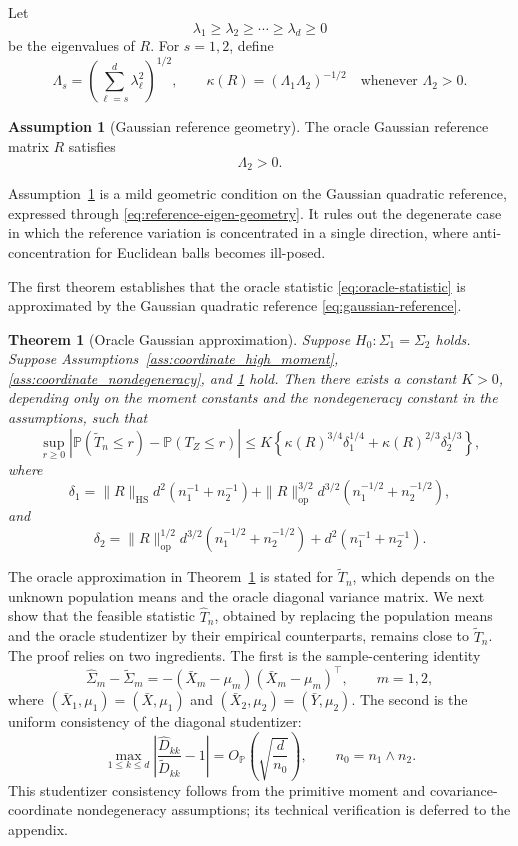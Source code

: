 \documentclass[
  12pt]{article}
\theoremstyle{plain}
\newtheorem{theorem}{Theorem}[section]
\theoremstyle{definition}
\newtheorem{assumption}{Assumption}[section]
\theoremstyle{remark}
\begin{document}
Let
\[
\lambda_1\ge\lambda_2\ge\cdots\ge\lambda_d\ge0
\]
be the eigenvalues of \(R\).  For \(s=1,2\), define
\begin{equation}
\label{eq:reference-eigen-geometry}
\Lambda_s
=
\left(\sum_{\ell=s}^d\lambda_\ell^2\right)^{1/2},
\qquad
\kappa(R)=(\Lambda_1\Lambda_2)^{-1/2}
\quad\text{whenever }\Lambda_2>0.
\end{equation}

\begin{assumption}[Gaussian reference geometry]
\label{ass:gaussian_reference_geometry}
The oracle Gaussian reference matrix \(R\) satisfies
\[
\Lambda_2>0 .
\]
\end{assumption}

Assumption~\ref{ass:gaussian_reference_geometry} is a mild geometric condition
on the Gaussian quadratic reference, expressed through
\eqref{eq:reference-eigen-geometry}.  It rules out the degenerate case in which
the reference variation is concentrated in a single direction, where
anti-concentration for Euclidean balls becomes ill-posed.

The first theorem establishes that the oracle statistic
\eqref{eq:oracle-statistic} is approximated by the Gaussian quadratic reference
\eqref{eq:gaussian-reference}.

\begin{theorem}[Oracle Gaussian approximation]
\label{thm:oracle_gaussian}
Suppose \(H_0:\Sigma_1=\Sigma_2\) holds.  Suppose
Assumptions~\ref{ass:coordinate_high_moment},
\ref{ass:coordinate_nondegeneracy}, and
\ref{ass:gaussian_reference_geometry} hold.  Then there exists a constant
\(K>0\), depending only on the moment constants and the nondegeneracy constant
in the assumptions, such that
\[
\sup_{r\ge0}
\left|
\mathbb P(\widetilde T_n\le r)
-
\mathbb P(T_Z\le r)
\right|
\le
K
\left\{
\kappa(R)^{3/4}\delta_1^{1/4}
+
\kappa(R)^{2/3}\delta_2^{1/3}
\right\},
\]
where
\[
\delta_1
=
\|R\|_{\mathrm{HS}}
d^2
\left(n_1^{-1}+n_2^{-1}\right)
+
\|R\|_{\mathrm{op}}^{3/2}
d^{3/2}
\left(n_1^{-1/2}+n_2^{-1/2}\right),
\]
and
\[
\delta_2
=
\|R\|_{\mathrm{op}}^{1/2}
d^{3/2}
\left(n_1^{-1/2}+n_2^{-1/2}\right)
+
d^2
\left(n_1^{-1}+n_2^{-1}\right).
\]
\end{theorem}

The oracle approximation in Theorem~\ref{thm:oracle_gaussian} is stated for
\(\widetilde T_n\), which depends on the unknown population means and the
oracle diagonal variance matrix.  We next show that the feasible statistic
\(\widehat T_n\), obtained by replacing the population means and the oracle
studentizer by their empirical counterparts, remains close to \(\widetilde T_n\).
The proof relies on two ingredients.  The first is the sample-centering identity
\[
\widehat\Sigma_m-\widetilde\Sigma_m
=
-(\bar X_m-\mu_m)(\bar X_m-\mu_m)^\top,
\qquad m=1,2,
\]
where \((\bar X_1,\mu_1)=(\bar X,\mu_1)\) and
\((\bar X_2,\mu_2)=(\bar Y,\mu_2)\).  The second is the uniform consistency of
the diagonal studentizer:
\[
\max_{1\le k\le d}
\left|
\frac{\widehat D_{kk}}{\widetilde D_{kk}}-1
\right|
=
O_{\mathbb P}
\left(
\sqrt{\frac d{n_0}}
\right),
\qquad
n_0=n_1\wedge n_2.
\]
This studentizer consistency follows from the primitive moment and
covariance-coordinate nondegeneracy assumptions; its technical verification is
deferred to the appendix.
\end{document}
